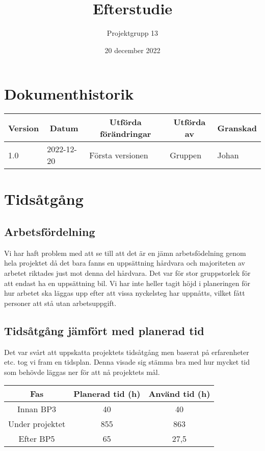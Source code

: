 \documentclass[10pt,oneside,swedish]{lips}
\title{Efterstudie}
\author{Projektgrupp 13}
\date{20 december 2022}
\begin{document}


\cleardoublepage
\tableofcontents

\cleardoublepage
\section*{Dokumenthistorik}
\begin{tabular}{p{}|p{}|p{}|p{}|p{}} 
  \multicolumn{1}{c}{\bfseries Version} & 
  \multicolumn{1}{|c}{\bfseries Datum} & 
  \multicolumn{1}{|c}{\bfseries Utförda förändringar} & 
  \multicolumn{1}{|c}{\bfseries Utförda av} & 
  \multicolumn{1}{|c}{\bfseries Granskad}\\
  \hline
  \hline
  1.0 & 2022-12-20 & Första versionen & Gruppen & Johan   \\
  \hline
\end{tabular}

\cleardoublepage
{}\cfoot{\thepage}

\section{Tidsåtgång}

\subsection{Arbetsfördelning}
Vi har haft problem med att se till att det är en jämn arbetsfödelning genom hela projektet då det bara fanns en uppsättning hårdvara och majoriteten av arbetet riktades just mot denna del hårdvara. Det var för stor gruppstorlek för att endast ha en uppsättning bil. 
Vi har inte heller tagit höjd i planeringen för hur arbetet ska läggas upp efter att vissa nyckelsteg har uppnåtts, vilket fått personer att stå utan arbetsuppgift. 

\subsection{Tidsåtgång jämfört med planerad tid}
Det var svårt att uppskatta projektets tidsåtgång men baserat på erfarenheter etc. tog vi fram en tidsplan. Denna visade sig stämma bra med hur mycket tid som behövde läggas ner för att nå projektets mål. \\

\begin{tabular}{| c | c | c |}
  \hline
  \bfseries Fas & \bfseries Planerad tid (h) & \bfseries Använd tid (h) \\
  \hline \hline
  Innan BP3 & 40 & 40   \\
  \hline
  Under projektet & 855 & 863 \\
  \hline
  Efter BP5 & 65 & 27,5   \\
  \hline
\end{tabular}
\end{document}
